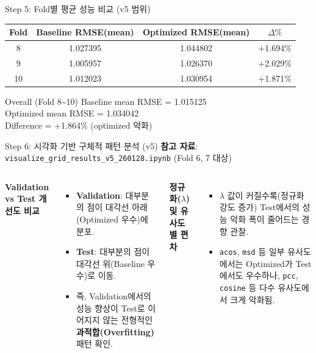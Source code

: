 \documentclass[aspectratio=169,10pt]{beamer}
\begin{document}
\begin{frame}{Step 5: Fold별 평균 성능 비교 (v5 범위)}
  \begin{center}
  \renewcommand{\arraystretch}{1.25}
  \begin{tabular}{c|c|c|c}
    \toprule
    Fold & Baseline RMSE(mean) & Optimized RMSE(mean) & \(\Delta\%\) \\
    \midrule
    8  & 1.027395 & 1.044802 & +1.694\% \\
    9  & 1.005957 & 1.026370 & +2.029\% \\
    10 & 1.012023 & 1.030954 & +1.871\% \\
    \bottomrule
  \end{tabular}
  \end{center}

  \vspace{0.4em}
  \begin{block}{Overall (Fold 8\textasciitilde10)}
    Baseline mean RMSE = 1.015125 \\
    Optimized mean RMSE = 1.034042 \\
    Difference = +1.864\% (optimized 악화)
  \end{block}
\end{frame}

\begin{frame}[shrink=5]{Step 6: 시각화 기반 구체적 패턴 분석 (v5)}
  \textbf{참고 자료}: \texttt{visualize\_grid\_results\_v5\_260128.ipynb} (Fold 6, 7 대상)

  \vspace{0.4em}
  \begin{columns}[T]
      \textbf{Validation vs Test 개선도 비교}
      \begin{itemize}
        \item \textbf{Validation}: 대부분의 점이 대각선 아래(Optimized 우수)에 분포.
        \item \textbf{Test}: 대부분의 점이 대각선 위(Baseline 우수)로 이동.
        \item 즉, Validation에서의 성능 향상이 Test로 이어지지 않는 전형적인 \textbf{과적합(Overfitting)} 패턴 확인.
      \end{itemize}

      \textbf{정규화(\(\lambda\)) 및 유사도별 편차}
      \begin{itemize}
        \item \(\lambda\) 값이 커질수록(정규화 강도 증가) Test에서의 성능 악화 폭이 줄어드는 경향 관찰.
        \item \texttt{acos}, \texttt{msd} 등 일부 유사도에서는 Optimized가 Test에서도 우수하나, \texttt{pcc}, \texttt{cosine} 등 다수 유사도에서 크게 악화됨.
      \end{itemize}
  \end{columns}
\end{frame}
\end{document}
